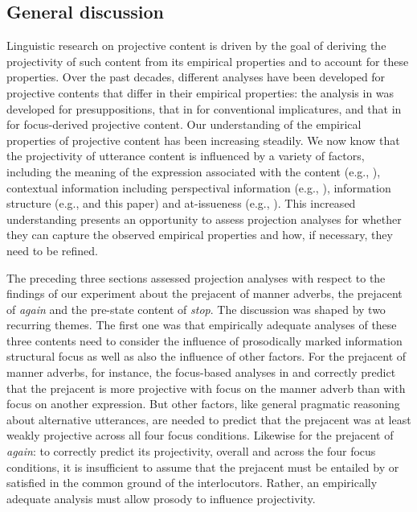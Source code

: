 \documentclass[a4paper,12pt]{article}
\newcommand{\6}{\mbox{$[\hspace*{-.6mm}[$}}
\newcommand{\9}{\mbox{$]\hspace*{-.6mm}]$}}
\begin{document}
\subsection{General discussion}\label{s44}

Linguistic research on projective content is driven by the goal of deriving the projectivity of such content from its empirical properties and to account for these properties. Over the past decades, different analyses have been developed for projective contents that differ in their empirical properties: the analysis in \citealt{heim83} was developed for presuppositions, that in \citealt{potts05} for conventional implicatures, and that in \citealt{abrusan2013} for focus-derived projective content. Our understanding of the empirical properties of projective content has been increasing steadily. We now know that the projectivity of utterance content is influenced by a variety of factors, including the meaning of the expression associated with the content (e.g., \citealt{karttunen71b,tbd-variability}), contextual information including perspectival information (e.g., \citealt{gazdar79a,harris-potts09}), information structure (e.g., \citealt{beaver-belly,tonhauser-salt26} and this paper) and at-issueness (e.g., \citealt{tbd-variability}). This increased understanding presents an opportunity to assess projection analyses for whether they can capture the observed empirical properties and how, if necessary, they need to be refined.

The preceding three sections assessed projection analyses with respect to the findings of our experiment about the prejacent of manner adverbs, the prejacent of {\em again} and the pre-state content of {\em stop}. The discussion was shaped by two recurring themes. The first one was that empirically adequate analyses of these three contents need to consider the influence of prosodically marked information structural focus as well as also the influence of other factors. For the prejacent of manner adverbs, for instance, the focus-based analyses in \citealt{abrusan2013} and \citealt{stevens-etal2017} correctly predict that the prejacent is more projective with focus on the manner adverb than with focus on another expression. But other factors, like general pragmatic reasoning about alternative utterances, are needed to predict that the prejacent was at least weakly projective across all four focus conditions. Likewise for the prejacent of {\em again}: to correctly predict its projectivity, overall and across the four focus conditions, it is insufficient to assume that the prejacent must be entailed by or satisfied in the common ground of the interlocutors. Rather, an empirically adequate analysis must allow prosody to influence projectivity.
\end{document}
